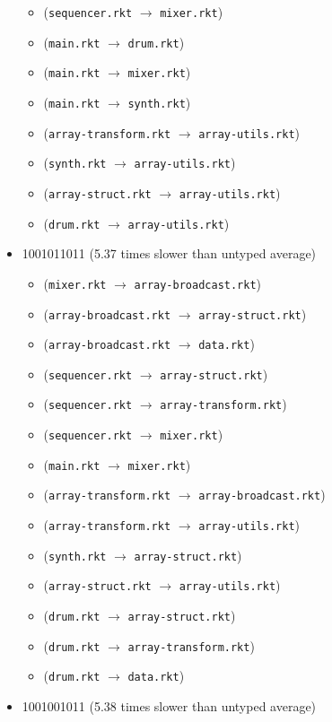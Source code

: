 \documentclass{article}
\newcommand{\mono}[1]{\texttt{#1}}
\begin{document}
\begin{itemize}
\begin{itemize}
  \item (\mono{sequencer.rkt} $\rightarrow$ \mono{mixer.rkt})
  \item (\mono{main.rkt} $\rightarrow$ \mono{drum.rkt})
  \item (\mono{main.rkt} $\rightarrow$ \mono{mixer.rkt})
  \item (\mono{main.rkt} $\rightarrow$ \mono{synth.rkt})
  \item (\mono{array-transform.rkt} $\rightarrow$ \mono{array-utils.rkt})
  \item (\mono{synth.rkt} $\rightarrow$ \mono{array-utils.rkt})
  \item (\mono{array-struct.rkt} $\rightarrow$ \mono{array-utils.rkt})
  \item (\mono{drum.rkt} $\rightarrow$ \mono{array-utils.rkt})
  \end{itemize}
\item 1001011011 (5.37 times slower than untyped average)
  \begin{itemize}
  \item (\mono{mixer.rkt} $\rightarrow$ \mono{array-broadcast.rkt})
  \item (\mono{array-broadcast.rkt} $\rightarrow$ \mono{array-struct.rkt})
  \item (\mono{array-broadcast.rkt} $\rightarrow$ \mono{data.rkt})
  \item (\mono{sequencer.rkt} $\rightarrow$ \mono{array-struct.rkt})
  \item (\mono{sequencer.rkt} $\rightarrow$ \mono{array-transform.rkt})
  \item (\mono{sequencer.rkt} $\rightarrow$ \mono{mixer.rkt})
  \item (\mono{main.rkt} $\rightarrow$ \mono{mixer.rkt})
  \item (\mono{array-transform.rkt} $\rightarrow$ \mono{array-broadcast.rkt})
  \item (\mono{array-transform.rkt} $\rightarrow$ \mono{array-utils.rkt})
  \item (\mono{synth.rkt} $\rightarrow$ \mono{array-struct.rkt})
  \item (\mono{array-struct.rkt} $\rightarrow$ \mono{array-utils.rkt})
  \item (\mono{drum.rkt} $\rightarrow$ \mono{array-struct.rkt})
  \item (\mono{drum.rkt} $\rightarrow$ \mono{array-transform.rkt})
  \item (\mono{drum.rkt} $\rightarrow$ \mono{data.rkt})
  \end{itemize}
\item 1001001011 (5.38 times slower than untyped average)

\end{itemize}
\end{document}
